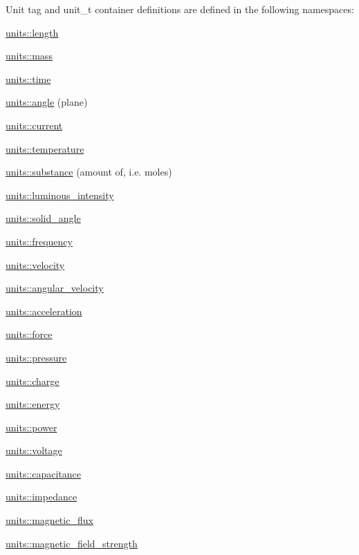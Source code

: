 Unit tag and unit\+\_\+t container definitions are defined in the following namespaces\+:
\begin{DoxyItemize}
\item \hyperlink{namespaceunits_1_1length}{units\+::length}
\item \hyperlink{namespaceunits_1_1mass}{units\+::mass}
\item \hyperlink{namespaceunits_1_1time}{units\+::time}
\item \hyperlink{namespaceunits_1_1angle}{units\+::angle} (plane)
\item \hyperlink{namespaceunits_1_1current}{units\+::current}
\item \hyperlink{namespaceunits_1_1temperature}{units\+::temperature}
\item \hyperlink{namespaceunits_1_1substance}{units\+::substance} (amount of, i.\+e. moles)
\item \hyperlink{namespaceunits_1_1luminous__intensity}{units\+::luminous\+\_\+intensity}
\item \hyperlink{namespaceunits_1_1solid__angle}{units\+::solid\+\_\+angle}
\item \hyperlink{namespaceunits_1_1frequency}{units\+::frequency}
\item \hyperlink{namespaceunits_1_1velocity}{units\+::velocity}
\item \hyperlink{namespaceunits_1_1angular__velocity}{units\+::angular\+\_\+velocity}
\item \hyperlink{namespaceunits_1_1acceleration}{units\+::acceleration}
\item \hyperlink{namespaceunits_1_1force}{units\+::force}
\item \hyperlink{namespaceunits_1_1pressure}{units\+::pressure}
\item \hyperlink{namespaceunits_1_1charge}{units\+::charge}
\item \hyperlink{namespaceunits_1_1energy}{units\+::energy}
\item \hyperlink{namespaceunits_1_1power}{units\+::power}
\item \hyperlink{namespaceunits_1_1voltage}{units\+::voltage}
\item \hyperlink{namespaceunits_1_1capacitance}{units\+::capacitance}
\item \hyperlink{namespaceunits_1_1impedance}{units\+::impedance}
\item \hyperlink{namespaceunits_1_1magnetic__flux}{units\+::magnetic\+\_\+flux}
\item \hyperlink{namespaceunits_1_1magnetic__field__strength}{units\+::magnetic\+\_\+field\+\_\+strength}

\end{DoxyItemize}
